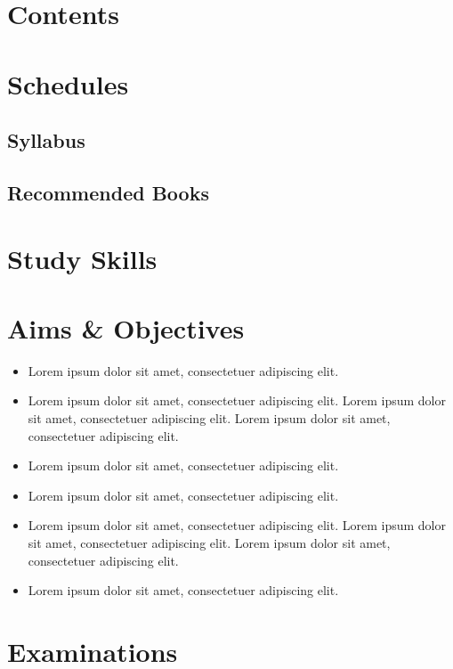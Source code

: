 {}
\def\headertitle{Introduction}

\begin{multicols}{2}

\section{Contents}
  \lipsum[1]

\section{Schedules}
  \subsection{Syllabus}
    \lipsum[1-2]
  \subsection{Recommended Books}
    \lipsum[3]

\section{Study Skills}
  \lipsum[1]

\section{Aims \& Objectives}
  \begin{itemize}
    \item Lorem ipsum dolor sit amet, consectetuer adipiscing elit.
    \item Lorem ipsum dolor sit amet, consectetuer adipiscing elit. Lorem ipsum dolor sit amet, consectetuer adipiscing elit. Lorem ipsum dolor sit amet, consectetuer adipiscing elit.
    \item Lorem ipsum dolor sit amet, consectetuer adipiscing elit.
    \item Lorem ipsum dolor sit amet, consectetuer adipiscing elit.
    \item Lorem ipsum dolor sit amet, consectetuer adipiscing elit. Lorem ipsum dolor sit amet, consectetuer adipiscing elit. Lorem ipsum dolor sit amet, consectetuer adipiscing elit.
    \item Lorem ipsum dolor sit amet, consectetuer adipiscing elit.
  \end{itemize}
  \lipsum[1]

\section{Examinations}

\end{multicols}

